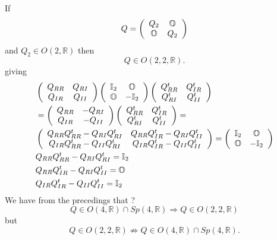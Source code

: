 \documentclass[aps,preprint]{revtex4}%
\begin{document}
If
\begin{equation}
Q=\left(
\begin{array}
[c]{cc}%
Q_{2} & \mathbb{O}\\
\mathbb{O} & Q_{2}%
\end{array}
\right)
\end{equation}
and $Q_{2}\in O\left(  2,\mathbb{R}\right)  $ then
\begin{equation}
Q\in O\left(  2,2,\mathbb{R}\right)  .
\end{equation}
giving
\begin{align}
&  \left(
\begin{array}
[c]{cc}%
Q_{RR} & Q_{RI}\\
Q_{IR} & Q_{II}%
\end{array}
\right)  \left(
\begin{array}
[c]{cc}%
\mathbb{I}_{2} & \mathbb{O}\\
\mathbb{O} & -\mathbb{I}_{2}%
\end{array}
\right)  \left(
\begin{array}
[c]{cc}%
Q_{RR}^{t} & Q_{IR}^{t}\\
Q_{RI}^{t} & Q_{II}^{t}%
\end{array}
\right) \\
&  =\left(
\begin{array}
[c]{cc}%
Q_{RR} & \mathbb{-}Q_{RI}\\
Q_{IR} & -Q_{II}%
\end{array}
\right)  \left(
\begin{array}
[c]{cc}%
Q_{RR}^{t} & Q_{IR}^{t}\\
Q_{RI}^{t} & Q_{II}^{t}%
\end{array}
\right)  =\\
&  \left(
\begin{array}
[c]{cc}%
Q_{RR}Q_{RR}^{t}-Q_{RI}Q_{RI}^{t} & Q_{RR}Q_{IR}^{t}-Q_{RI}Q_{II}^{t}\\
Q_{IR}Q_{RR}^{t}-Q_{II}Q_{RI}^{t} & Q_{IR}Q_{IR}^{t}-Q_{II}Q_{II}^{t}%
\end{array}
\right)  =\left(
\begin{array}
[c]{cc}%
\mathbb{I}_{2} & \mathbb{O}\\
\mathbb{O} & -\mathbb{I}_{2}%
\end{array}
\right) \\
&  Q_{RR}Q_{RR}^{t}-Q_{RI}Q_{RI}^{t}=\mathbb{I}_{2}\\
&  Q_{RR}Q_{IR}^{t}-Q_{RI}Q_{II}^{t}=\mathbb{O}\\
&  Q_{IR}Q_{IR}^{t}-Q_{II}Q_{II}^{t}=\mathbb{I}_{2}%
\end{align}
We have from the precedings that ?
\begin{equation}
Q\in O\left(  4,\mathbb{R}\right)  \cap Sp\left(  4,\mathbb{R}\right)
\Rightarrow Q\in O\left(  2,2,\mathbb{R}\right)
\end{equation}
but
\begin{equation}
Q\in O\left(  2,2,\mathbb{R}\right)  \nRightarrow Q\in O\left(  4,\mathbb{R}%
\right)  \cap Sp\left(  4,\mathbb{R}\right)  .
\end{equation}
\end{document}
